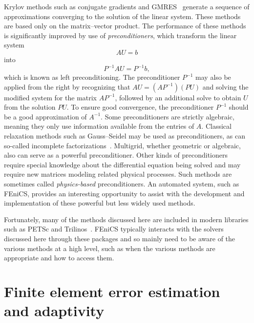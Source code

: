 %
Krylov methods such as conjugate gradients and
GMRES~\citep{SaadSchultz1986} generate a sequence of approximations
converging to the solution of the linear system. These methods are
based only on the matrix--vector product.  The performance of these
methods is significantly improved by use of \emph{preconditioners},
which transform the linear system
\begin{equation}
AU = b
\end{equation}
into
\begin{equation}
P^{-1} A U = P^{-1} b,
\end{equation}
which is known as left preconditioning. The preconditioner $P^{-1}$
may also be applied from the right by recognizing that $A U = (A
P^{-1}) (P U)$ and solving the modified system for the matrix $A
P^{-1}$, followed by an additional solve to obtain $U$ from the
solution $PU$. To ensure good convergence, the preconditioner $P^{-1}$
should be a good approximation of $A^{-1}$. Some preconditioners are
strictly algebraic, meaning they only use information available from
the entries of \( A \). Classical relaxation methods such as
Gauss--Seidel may be used as preconditioners, as can so-called
incomplete
factorizations~\citep{Manteuffel1980,Axelsson1986,Saad1994}. Multigrid,
whether geometric or algebraic, also can serve as a powerful
preconditioner. Other kinds of preconditioners require special
knowledge about the differential equation being solved and may require
new matrices modeling related physical processes.  Such methods are
sometimes called \emph{physics-based} preconditioners. An automated
system, such as FEniCS, provides an interesting opportunity to assist
with the development and implementation of these powerful but less
widely used methods.

Fortunately, many of the methods discussed here are included in modern
libraries such as PETSc \citep{BalayBuschelmanEijkhoutEtAl2004} and
Trilinos~\citep{HerouxBartlettHowleEtAl2005}. FEniCS typically
interacts with the solvers discussed here through these packages and
so mainly need to be aware of the various methods at a high level,
such as when the various methods are appropriate and how to access
them.

\section{Finite element error estimation and adaptivity}

